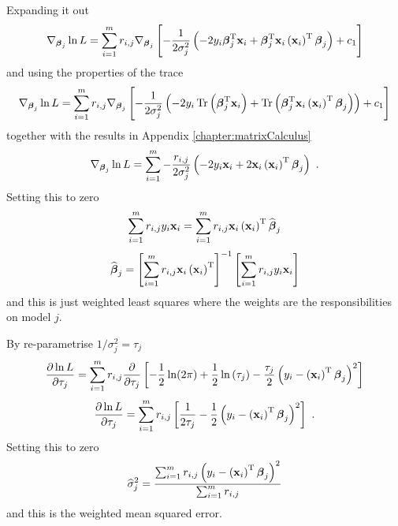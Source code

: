 \documentclass[12pt]{report}
\DeclareMathOperator{\trace}{Tr}
\newcommand{\T}{^\textup{T}}
\newcommand{\vect}[1]{\mathbf{#1}}
\newcommand{\vectGreek}[1]{\boldsymbol{#1}}
\begin{document}
Expanding it out
\begin{equation*}
\nabla_{\vectGreek{\beta}_j}\ln{L}
=\sum_{i=1}^{m}
r_{i,j}
\nabla_{\vectGreek{\beta}_j}
\left[-\frac{1}{2\sigma_j^2}\left(-2y_i\vectGreek{\beta}_j\T\vect{x}_i
+\vectGreek{\beta}_j\T\vect{x}_i\left(\vect{x}_i\right)\T\vectGreek{\beta}_j
\right)
+c_1
\right]
\end{equation*}
and using the properties of the trace
\begin{equation*}
\nabla_{\vectGreek{\beta}_j}\ln{L}
=\sum_{i=1}^{m}
r_{i,j}
\nabla_{\vectGreek{\beta}_j}
\left[-\frac{1}{2\sigma_j^2}\left(-2y_i\trace\left(\vectGreek{\beta}_j\T\vect{x}_i\right)
+\trace\left(\vectGreek{\beta}_j\T\vect{x}_i\left(\vect{x}_i\right)\T\vectGreek{\beta}_j
\right)\right)
+c_1
\right]
\end{equation*}
together with the results in Appendix \ref{chapter:matrixCalculus}
\begin{equation}
\nabla_{\vectGreek{\beta}_j}\ln{L}
=\sum_{i=1}^{m}
-\frac{r_{i,j}}{2\sigma_j^2}
\left(-2y_i\vect{x}_i
+2\vect{x}_i\left(\vect{x}_i\right)\T\vectGreek{\beta}_j
\right) \ .
\end{equation}
Setting this to zero
\begin{equation*}
\sum_{i=1}^{m}
r_{i,j}
y_i\vect{x}_i
=
\sum_{i=1}^{m}r_{i,j}
\vect{x}_i\left(\vect{x}_i\right)\T\widehat{\vectGreek{\beta}}_j
\end{equation*}
\begin{equation}
\widehat{\vectGreek{\beta}}_j
=
\left[\sum_{i=1}^{m}r_{i,j}
\vect{x}_i\left(\vect{x}_i\right)\T\right]^{-1}
\left[\sum_{i=1}^{m}
r_{i,j}
y_i\vect{x}_i\right]
\end{equation}
and this is just weighted least squares where the weights are the responsibilities on model $j$.

By re-parametrise $1/\sigma_j^2=\tau_j$
\begin{equation*}
\frac{\partial\ln{L}}{\partial\tau_j}
=\sum_{i=1}^{m}
r_{i,j}
\frac{\partial}{\partial\tau_j}
\left[
	-\frac{1}{2}\ln(2\pi) + \frac{1}{2}\ln\left(\tau_j\right)-\frac{\tau_j}{2}\left({y_i-\left(\vect{x}_i\right)\T\vectGreek{\beta}_j}\right)^2
\right]
\end{equation*}
\begin{equation}
\frac{\partial\ln{L}}{\partial\tau_j}
=\sum_{i=1}^{m}
r_{i,j}
\left[\frac{1}{2\tau_j}-\frac{1}{2}\left({y_i-\left(\vect{x}_i\right)\T\vectGreek{\beta}_j}\right)^2
\right] \ .
\end{equation}
Setting this to zero
\begin{equation}
\widehat{\sigma}_j^2
=
\frac{\sum_{i=1}^{m}
r_{i,j}\left({y_i-\left(\vect{x}_i\right)\T\vectGreek{\beta}_j}\right)^2}
{\sum_{i=1}^{m}r_{i,j}}
\end{equation}
and this is the weighted mean squared error.
\end{document}
